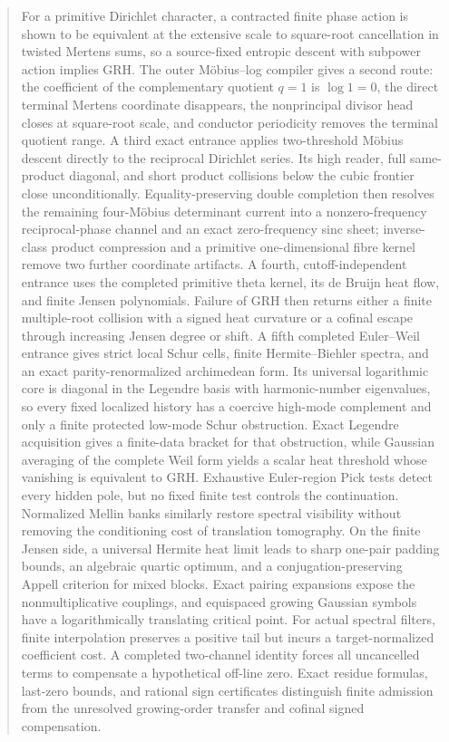 \documentclass[11pt]{article}
\theoremstyle{definition}
\theoremstyle{remark}
\begin{document}
\begin{abstract}
For a primitive Dirichlet character, a contracted finite phase action is
shown to be equivalent at the extensive scale to square-root cancellation in
twisted Mertens sums, so a source-fixed entropic descent with subpower action
implies GRH.  The outer M\"obius--log compiler gives a second route: the
coefficient of the complementary quotient $q=1$ is $\log1=0$, the direct
terminal Mertens coordinate disappears, the nonprincipal divisor head closes
at square-root scale, and conductor periodicity removes the terminal quotient
range.  A third exact entrance applies two-threshold M\"obius descent directly
to the reciprocal Dirichlet series.  Its high reader, full same-product
diagonal, and short product collisions below the cubic frontier close
unconditionally.  Equality-preserving double completion then resolves the
remaining four-M\"obius determinant current into a nonzero-frequency
reciprocal-phase channel and an exact zero-frequency sinc sheet; inverse-class
product compression and a primitive one-dimensional fibre kernel remove two
further coordinate artifacts.  A fourth, cutoff-independent entrance uses the
completed primitive theta kernel, its de Bruijn heat flow, and finite Jensen
polynomials.  Failure of GRH then returns either a finite multiple-root
collision with a signed heat curvature or a cofinal escape through increasing
Jensen degree or shift.  A fifth completed Euler--Weil entrance gives strict
local Schur cells, finite Hermite--Biehler spectra, and an exact
parity-renormalized archimedean form.  Its universal logarithmic core is
diagonal in the Legendre basis with harmonic-number eigenvalues, so every
fixed localized history has a coercive high-mode complement and only a finite
protected low-mode Schur obstruction.  Exact Legendre acquisition gives a
finite-data bracket for that obstruction, while Gaussian averaging of the
complete Weil form yields a scalar heat threshold whose vanishing is
equivalent to GRH.  Exhaustive Euler-region Pick tests detect every hidden
pole, but no fixed finite test controls the continuation.  Normalized Mellin
banks similarly restore spectral visibility without removing the conditioning
cost of translation tomography.  On the finite Jensen side, a universal
Hermite heat limit leads to sharp one-pair padding bounds, an algebraic
quartic optimum, and a conjugation-preserving Appell criterion for mixed
blocks.  Exact pairing expansions expose the nonmultiplicative
couplings, and equispaced growing Gaussian symbols have a logarithmically
translating critical point.  For actual spectral filters, finite
interpolation preserves a positive tail but incurs a target-normalized
coefficient cost.  A completed two-channel identity forces all uncancelled
terms to compensate a hypothetical off-line zero.  Exact residue formulas,
last-zero bounds, and rational sign certificates distinguish finite
admission from the unresolved growing-order transfer and cofinal signed
compensation.


\end{abstract}
\end{document}
